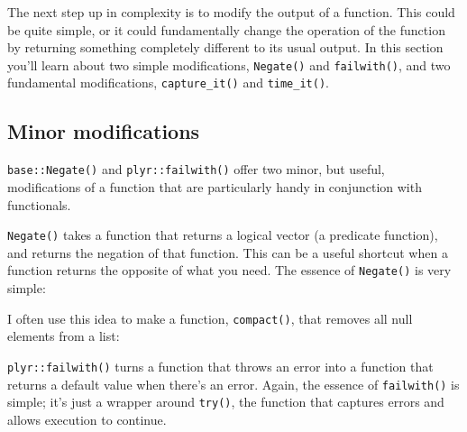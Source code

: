 The next step up in complexity is to modify the output of a function.
This could be quite simple, or it could fundamentally change the
operation of the function by returning something completely different to
its usual output. In this section you'll learn about two simple
modifications, \texttt{Negate()} and \texttt{failwith()}, and two
fundamental modifications, \texttt{capture\_it()} and
\texttt{time\_it()}.

\subsection{Minor modifications}

\texttt{base::Negate()} and \texttt{plyr::failwith()} offer two minor,
but useful, modifications of a function that are particularly handy in
conjunction with functionals.  

\texttt{Negate()} takes a function that returns a logical vector (a
predicate function), and returns the negation of that function. This can
be a useful shortcut when a function returns the opposite of what you
need. The essence of \texttt{Negate()} is very simple:

\begin{Shaded}
\begin{Highlighting}[]
\StringTok{ }
\NormalTok{\}}
\NormalTok{(}\NormalTok{)}
\end{Highlighting}
\end{Shaded}

I often use this idea to make a function, \texttt{compact()}, that
removes all null elements from a list: 

\begin{Shaded}
\begin{Highlighting}[]
\StringTok{ }\NormalTok{(}
\end{Highlighting}
\end{Shaded}

\texttt{plyr::failwith()} turns a function that throws an error into a
function that returns a default value when there's an error. Again, the
essence of \texttt{failwith()} is simple; it's just a wrapper around
\texttt{try()}, the function that captures errors and allows execution
to continue. 

